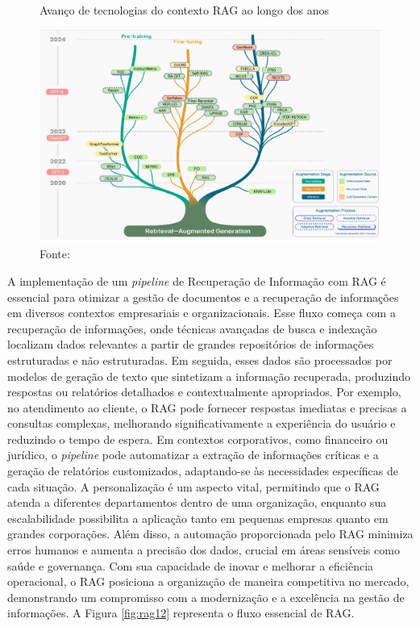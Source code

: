 \begin{figure}[H]
    \centering
    \caption{Avanço de tecnologias do contexto RAG ao longo dos anos}
    \includegraphics[width=\linewidth]{img/RAG/rag1.png}
    \caption*{Fonte: \cite{gao2024retrievalaugmentedgenerationlargelanguage}}
    \label{fig:rag1}
\end{figure}

A implementação de um \textit{pipeline} de Recuperação de Informação com RAG é essencial para otimizar a gestão de documentos e a recuperação de informações em diversos contextos empresariais e organizacionais. Esse fluxo começa com a recuperação de informações, onde técnicas avançadas de busca e indexação localizam dados relevantes a partir de grandes repositórios de informações estruturadas e não estruturadas. Em seguida, esses dados são processados por modelos de geração de texto que sintetizam a informação recuperada, produzindo respostas ou relatórios detalhados e contextualmente apropriados. Por exemplo, no atendimento ao cliente, o RAG pode fornecer respostas imediatas e precisas a consultas complexas, melhorando significativamente a experiência do usuário e reduzindo o tempo de espera. Em contextos corporativos, como financeiro ou jurídico, o \textit{pipeline} pode automatizar a extração de informações críticas e a geração de relatórios customizados, adaptando-se às necessidades específicas de cada situação. A personalização é um aspecto vital, permitindo que o RAG atenda a diferentes departamentos dentro de uma organização, enquanto sua escalabilidade possibilita a aplicação tanto em pequenas empresas quanto em grandes corporações. Além disso, a automação proporcionada pelo RAG minimiza erros humanos e aumenta a precisão dos dados, crucial em áreas sensíveis como saúde e governança. Com sua capacidade de inovar e melhorar a eficiência operacional, o RAG posiciona a organização de maneira competitiva no mercado, demonstrando um compromisso com a modernização e a excelência na gestão de informações. 
A Figura \ref{fig:rag12} representa o fluxo essencial de RAG. 

